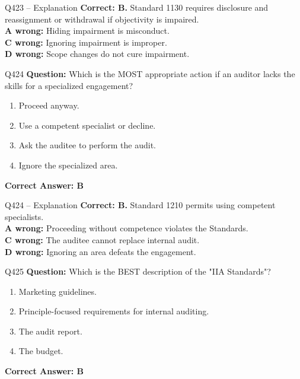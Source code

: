\documentclass[aspectratio=169,10pt]{beamer}
\begin{document}
	\begin{frame}[t]{Q423 -- Explanation}
		\small
		\textbf{Correct: B.} Standard 1130 requires disclosure and reassignment or withdrawal if objectivity is impaired. \\[4pt]
		\textbf{A wrong:} Hiding impairment is misconduct. \\[2pt]
		\textbf{C wrong:} Ignoring impairment is improper. \\[2pt]
		\textbf{D wrong:} Scope changes do not cure impairment.
	\end{frame}
	
	\begin{frame}[t]{Q424}
		\small
		\textbf{Question:} Which is the MOST appropriate action if an auditor lacks the skills for a specialized engagement?
		\begin{enumerate}[label=\Alph*.,itemsep=1pt,topsep=2pt]
			\item Proceed anyway.
			\item Use a competent specialist or decline.
			\item Ask the auditee to perform the audit.
			\item Ignore the specialized area.
		\end{enumerate}
		\vspace{4pt}
		\textbf{Correct Answer: B}
	\end{frame}
	
	\begin{frame}[t]{Q424 -- Explanation}
		\small
		\textbf{Correct: B.} Standard 1210 permits using competent specialists. \\[4pt]
		\textbf{A wrong:} Proceeding without competence violates the Standards. \\[2pt]
		\textbf{C wrong:} The auditee cannot replace internal audit. \\[2pt]
		\textbf{D wrong:} Ignoring an area defeats the engagement.
	\end{frame}
	
	\begin{frame}[t]{Q425}
		\small
		\textbf{Question:} Which is the BEST description of the "IIA Standards"?
		\begin{enumerate}[label=\Alph*.,itemsep=1pt,topsep=2pt]
			\item Marketing guidelines.
			\item Principle-focused requirements for internal auditing.
			\item The audit report.
			\item The budget.
		\end{enumerate}
		\vspace{4pt}
		\textbf{Correct Answer: B}
	\end{frame}
	
\end{document}
